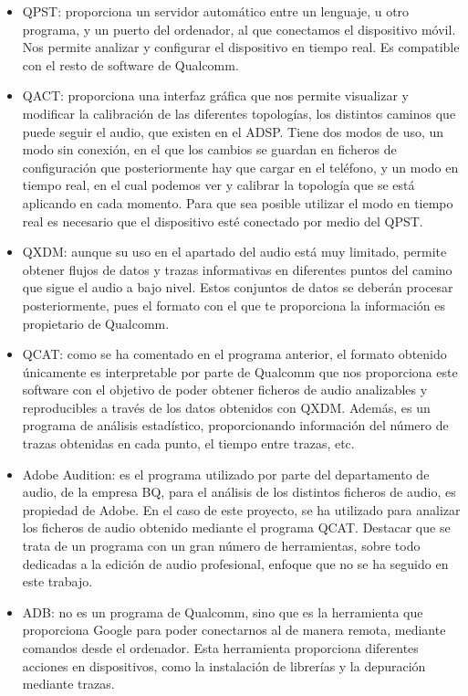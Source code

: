 \begin{itemize}
	\item{\gls{QPST}: proporciona un servidor automático entre un lenguaje, u otro programa, y un puerto del ordenador, al que conectamos el dispositivo móvil. Nos permite analizar y configurar el dispositivo en tiempo real. Es compatible con el resto de software de Qualcomm.}
	\item{\gls{QACT}: proporciona una interfaz gráfica que nos permite visualizar y modificar la calibración de las diferentes topologías, los distintos caminos que puede seguir el audio, que existen en el \gls{ADSP}. Tiene dos modos de uso, un modo sin conexión, en el que los cambios se guardan en ficheros de configuración que posteriormente hay que cargar en el teléfono, y un modo en tiempo real, en el cual podemos ver y calibrar la topología que se está aplicando en cada momento. Para que sea posible utilizar el modo en tiempo real es necesario que el dispositivo esté conectado por medio del \gls{QPST}.}
	\item{\gls{QXDM}: aunque su uso en el apartado del audio está muy limitado, permite obtener flujos de datos y trazas informativas en diferentes puntos del camino que sigue el audio a bajo nivel. Estos conjuntos de datos se deberán procesar posteriormente, pues el formato con el que te proporciona la información es propietario de Qualcomm.}
	\item{\gls{QCAT}: como se ha comentado en el programa anterior, el formato obtenido únicamente es interpretable por parte de Qualcomm que nos proporciona este software con el objetivo de poder obtener ficheros de audio analizables y reproducibles a través de los datos obtenidos con \gls{QXDM}. Además, es un programa de análisis estadístico, proporcionando información del número de trazas obtenidas en cada punto, el tiempo entre trazas, etc.}
	\item{Adobe Audition: es el programa utilizado por parte del departamento de audio, de la empresa BQ, para el análisis de los distintos ficheros de audio, es propiedad de Adobe. En el caso de este proyecto, se ha utilizado para analizar los ficheros de audio obtenido mediante el programa \gls{QCAT}. Destacar que se trata de un programa con un gran número de herramientas, sobre todo dedicadas a la edición de audio profesional, enfoque que no se ha seguido en este trabajo.}	
	\item{\gls{ADB}: no es un programa de Qualcomm, sino que es la herramienta que proporciona Google para poder conectarnos al de manera remota, mediante comandos desde el ordenador. Esta herramienta proporciona diferentes acciones en dispositivos, como la instalación de librerías y la depuración mediante trazas.}
\end{itemize}

